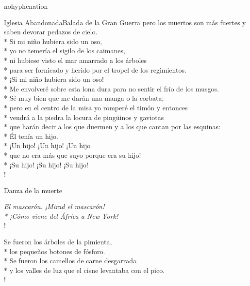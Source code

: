 \documentclass[
    a5paper,
    DIV=10,
    12pt,
    notitlepage,
    oneside,]
{scrbook} %
\begin{document}
\begin{hyphenrules}{nohyphenation}
\begin{poem}{Iglesia Abandonada}{Balada de la Gran Guerra}{}
pero los muertos son más fuertes y saben devorar pedazos de cielo.\\*
Si mi niño hubiera sido un oso,\\*
yo no temería el sigilo de los caimanes,\\*
ni hubiese visto el mar amarrado a los árboles\\*
para ser fornicado y herido por el tropel de los regimientos.\\*
¡Si mi niño hubiera sido un oso!\\*
Me envolveré sobre esta lona dura para no sentir el frío de los
musgos.\\*
Sé muy bien que me darán una manga o la corbata;\\*
pero en el centro de la misa yo romperé el timón y entonces\\*
vendrá a la piedra la locura de pingüinos y gaviotas\\*
que harán decir a los que duermen y a los que cantan por las esquinas:\\*
Él tenía un hijo.\\*
¡Un hijo! ¡Un hijo! ¡Un hijo\\*
que no era más que suyo porque era su hijo!\\*
¡Su hijo! ¡Su hijo! ¡Su hijo! \\!

\end{poem}




\begin{poem}{Danza de la muerte}{}{\vspace{-1em}}

\emph{El mascarón. ¡Mirad el mascarón!\\*
¡Cómo viene del África a New York!}\\!

Se fueron los árboles de la pimienta,\\*
los pequeños botones de fósforo.\\*
Se fueron los camellos de carne desgarrada\\*
y los valles de luz que el cisne levantaba con el pico.\\!


\end{poem}
\end{hyphenrules}
\end{document}
